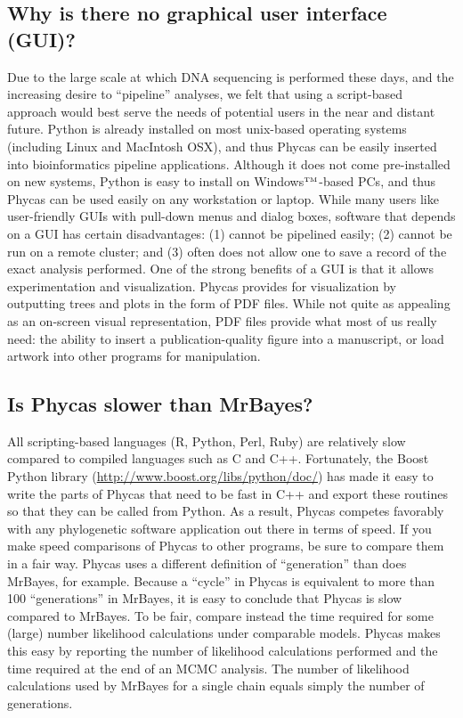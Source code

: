 \documentclass[10pt]{article}
\newcommand{\trademark}[1]{#1${}^{\mbox{\tiny TM}}$}
\begin{document}
\subsection{Why is there no graphical user interface (GUI)?}
Due to the large scale at which DNA sequencing is performed these days, and the increasing desire to ``pipeline'' analyses, we felt that using a script-based approach would best serve the needs of potential users in the near and distant future. Python is already installed on most unix-based operating systems (including Linux and MacIntosh OSX), and thus Phycas can be easily inserted into bioinformatics pipeline applications. Although it does not come pre-installed on new systems, Python is easy to install on \trademark{Windows}-based PCs, and thus Phycas can be used easily on any workstation or laptop. While many users like user-friendly GUIs with pull-down menus and dialog boxes, software that depends on a GUI has certain disadvantages: (1) cannot be pipelined easily; (2) cannot be run on a remote cluster; and (3) often does not allow one to save a record of the exact analysis performed. One of the strong benefits of a GUI is that it allows experimentation and visualization. Phycas provides for visualization by outputting trees and plots in the form of PDF files. While not quite as appealing as an on-screen visual representation, PDF files provide what most of us really need: the ability to insert a publication-quality figure into a manuscript, or load artwork into other programs for manipulation.  

\subsection{Is Phycas slower than MrBayes?}
All scripting-based languages (R, Python, Perl, Ruby) are relatively slow compared to compiled languages such as C and C++. Fortunately, the Boost Python library (\url{http://www.boost.org/libs/python/doc/}) has made it easy to write the parts of Phycas that need to be fast in C++ and export these routines so that they can be called from Python. As a result, Phycas competes favorably with any phylogenetic software application out there in terms of speed. If you make speed comparisons of Phycas to other programs, be sure to compare them in a fair way. Phycas uses a different definition of ``generation'' than does MrBayes, for example. Because a ``cycle'' in Phycas is equivalent to more than 100 ``generations'' in MrBayes, it is easy to conclude that Phycas is slow compared to MrBayes. To be fair, compare instead the time required for some (large) number likelihood calculations under comparable models. Phycas makes this easy by reporting the number of likelihood calculations performed and the time required at the end of an MCMC analysis. The number of likelihood calculations used by MrBayes for a single chain equals simply the number of generations.
\end{document}
